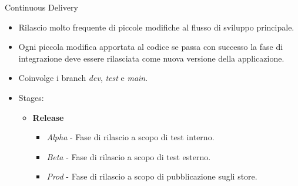     \begin{frame}{Continuous Delivery}
        \begin{itemize}
            \item Rilascio molto frequente di piccole modifiche al flusso di sviluppo principale.
            \item Ogni piccola modifica apportata al codice se passa con successo la fase di integrazione deve essere rilasciata come nuova versione della applicazione.
            \item Coinvolge i branch \textit{dev}, \textit{test} e \textit{main}.
            \item Stages:
            \begin{itemize}
                \item \textbf{Release}
                \begin{itemize}
                    \item \textit{Alpha} - Fase di rilascio a scopo di test interno.
                    \item \textit{Beta} - Fase di rilascio a scopo di test esterno.
                    \item \textit{Prod} - Fase di rilascio a scopo di pubblicazione sugli store.
                \end{itemize}
            \end{itemize}
        \end{itemize}
    \end{frame}

